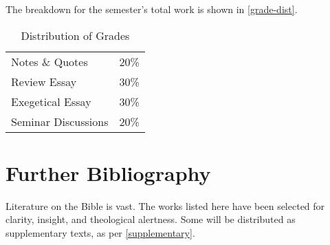 \documentclass[titlepage]{article}
\newcommand\policy{../policy}
\begin{document}
The breakdown for the semester's total work is shown in
\autoref{grade-dist}.

\begin{table}[htbp]
  \centering
  {\lining
  \begin{tabular}{lr}
    \toprule
    Notes \& Quotes     & 20\% \\
    Review Essay        & 30\% \\
    Exegetical Essay    & 30\% \\
    Seminar Discussions & 20\% \\
    \bottomrule
  \end{tabular}}
  \caption{Distribution of Grades}
  \label{grade-dist}
\end{table}





\section{Further Bibliography}
\label{bib}

Literature on the Bible is vast. The works listed here have been
selected for clarity, insight, and theological alertness. Some will be
distributed as supplementary texts, as per \autoref{supplementary}.
\end{document}
